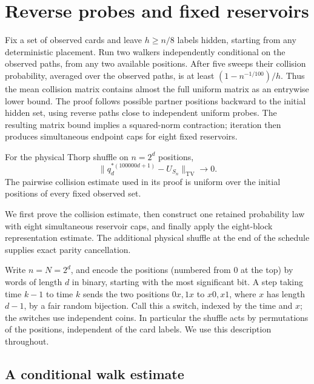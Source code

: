 \section{Reverse probes and fixed reservoirs}

\label{c:probes}

Fix a set of observed cards and leave $h\ge n/8$ labels hidden,
starting from any deterministic placement. Run two walkers independently
conditional on the observed paths, from any two available positions.
After five sweeps their collision probability, averaged over the observed
paths, is at least $(1-n^{-1/100})/h$. Thus the mean collision matrix
contains almost the full uniform matrix as an entrywise lower bound.
The proof follows possible partner positions backward to the initial
hidden set, using reverse paths close to independent uniform probes.
The resulting matrix bound implies a squared-norm contraction; iteration
then produces simultaneous endpoint caps for eight fixed reservoirs.

\begin{theorem}\label{c:probes:main}
For the physical Thorp shuffle on $n=2^d$ positions,
\[
 \|q_d^{*(100000d+1)}-U_{S_n}\|_{\mathrm{TV}}\longrightarrow0.
\]
The pairwise collision estimate used in its proof is uniform over the
initial positions of every fixed observed set.
\end{theorem}

We first prove the collision estimate, then construct one retained
probability law with eight simultaneous reservoir caps, and finally
apply the eight-block representation estimate. The additional physical
shuffle at the end of the schedule supplies exact parity cancellation.

\label{c:probes:p001}

Write \(n=N=2^d\), and encode the positions (numbered from \(0\) at the top) by words of length
\(d\) in binary, starting with the most significant bit. A step taking time \(k-1\) to time
\(k\) sends the two positions \(0x,1x\) to \(x0,x1\), where \(x\) has length \(d-1\), by a fair
random bijection. Call this a switch, indexed by the time and \(x\); the switches use
independent coins. In particular the shuffle acts by permutations of the positions, independent
of the card labels. We use this description throughout.

\label{c:probes:p003}
\label{c:probes:p004}

\subsection{A conditional walk estimate}

